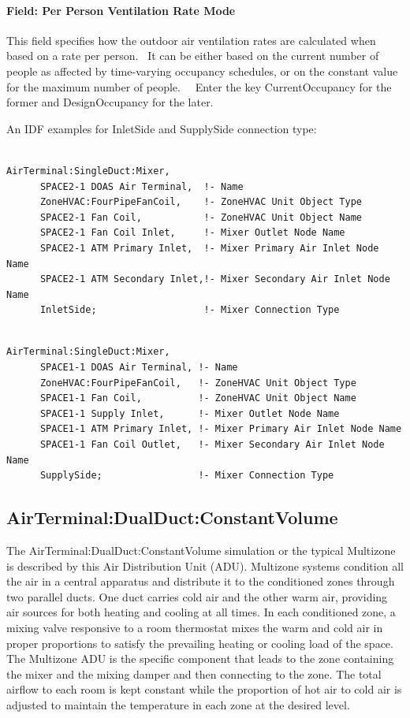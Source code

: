 \paragraph{Field: Per Person Ventilation Rate Mode}\label{field-per-person-ventilation-rate-mode}

This field specifies how the outdoor air ventilation rates are calculated when based on a rate per person.~ It can be either based on the current number of people as affected by time-varying occupancy schedules, or on the constant value for the maximum number of people.~~ Enter the key CurrentOccupancy for the former and DesignOccupancy for the later.

An IDF examples for InletSide and SupplySide connection type:

\begin{lstlisting}

AirTerminal:SingleDuct:Mixer,
      SPACE2-1 DOAS Air Terminal,  !- Name
      ZoneHVAC:FourPipeFanCoil,    !- ZoneHVAC Unit Object Type
      SPACE2-1 Fan Coil,           !- ZoneHVAC Unit Object Name
      SPACE2-1 Fan Coil Inlet,     !- Mixer Outlet Node Name
      SPACE2-1 ATM Primary Inlet,  !- Mixer Primary Air Inlet Node Name
      SPACE2-1 ATM Secondary Inlet,!- Mixer Secondary Air Inlet Node Name
      InletSide;                   !- Mixer Connection Type   
\end{lstlisting}

\begin{lstlisting}

AirTerminal:SingleDuct:Mixer,
      SPACE1-1 DOAS Air Terminal, !- Name
      ZoneHVAC:FourPipeFanCoil,   !- ZoneHVAC Unit Object Type
      SPACE1-1 Fan Coil,          !- ZoneHVAC Unit Object Name
      SPACE1-1 Supply Inlet,      !- Mixer Outlet Node Name
      SPACE1-1 ATM Primary Inlet, !- Mixer Primary Air Inlet Node Name
      SPACE1-1 Fan Coil Outlet,   !- Mixer Secondary Air Inlet Node Name
      SupplySide;                 !- Mixer Connection Type
\end{lstlisting}

\subsection{AirTerminal:DualDuct:ConstantVolume}\label{airterminaldualductconstantvolume}

The AirTerminal:DualDuct:ConstantVolume simulation or the typical Multizone is described by this Air Distribution Unit (ADU). Multizone systems condition all the air in a central apparatus and distribute it to the conditioned zones through two parallel ducts. One duct carries cold air and the other warm air, providing air sources for both heating and cooling at all times. In each conditioned zone, a mixing valve responsive to a room thermostat mixes the warm and cold air in proper proportions to satisfy the prevailing heating or cooling load of the space. The Multizone ADU is the specific component that leads to the zone containing the mixer and the mixing damper and then connecting to the zone. The total airflow to each room is kept constant while the proportion of hot air to cold air is adjusted to maintain the temperature in each zone at the desired level.

